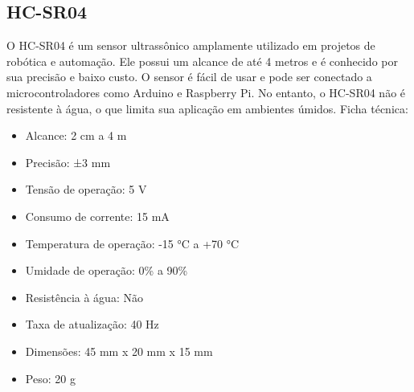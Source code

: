 \subsection{HC-SR04}
O HC-SR04 é um sensor ultrassônico amplamente utilizado em projetos de robótica e automação. Ele possui um alcance de até 4 metros e é conhecido por sua precisão e baixo custo. O sensor é fácil de usar e pode ser conectado a microcontroladores como Arduino e Raspberry Pi. No entanto, o HC-SR04 não é resistente à água, o que limita sua aplicação em ambientes úmidos.
Ficha técnica:
\begin{itemize}
	\item Alcance: 2 cm a 4 m
	\item Precisão: ±3 mm
	\item Tensão de operação: 5 V
	\item Consumo de corrente: 15 mA
	\item Temperatura de operação: -15 °C a +70 °C
	\item Umidade de operação: 0\% a 90\%
	\item Resistência à água: Não
	\item Taxa de atualização: 40 Hz
	\item Dimensões: 45 mm x 20 mm x 15 mm
	\item Peso: 20 g
\end{itemize}
